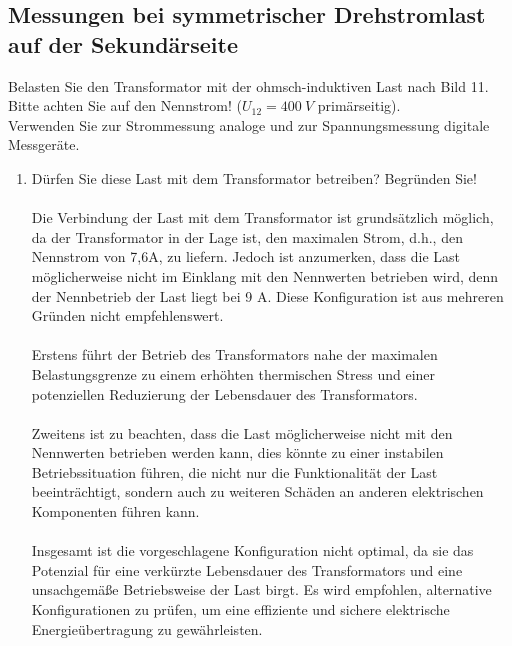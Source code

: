 \subsection{Messungen bei symmetrischer Drehstromlast auf der Sekundärseite }
Belasten Sie den Transformator mit der ohmsch-induktiven Last nach Bild 11.\\
Bitte achten Sie auf den Nennstrom! ($U_{12} = 400\ V$ primärseitig). \\
Verwenden Sie zur Strommessung analoge und zur Spannungsmessung digitale
Messgeräte.
\begin{enumerate}[label=\alph*)]
  \item Dürfen Sie diese Last mit dem Transformator betreiben? Begründen Sie!\\ \ \\
        Die Verbindung der Last mit dem Transformator ist grundsätzlich möglich, da der
        Transformator in der Lage ist, den maximalen Strom, d.h., den Nennstrom von
        7,6A, zu liefern. Jedoch ist anzumerken, dass die Last möglicherweise nicht im
        Einklang mit den Nennwerten betrieben wird, denn der Nennbetrieb der Last liegt
        bei 9 A. Diese Konfiguration ist aus mehreren Gründen nicht empfehlenswert.\\ \
        \\

        Erstens führt der Betrieb des Transformators nahe der maximalen
        Belastungsgrenze zu einem erhöhten thermischen Stress und einer potenziellen
        Reduzierung der Lebensdauer des Transformators.\\ \ \\

        Zweitens ist zu beachten, dass die Last möglicherweise nicht mit den Nennwerten
        betrieben werden kann, dies könnte zu einer instabilen Betriebssituation
        führen, die nicht nur die Funktionalität der Last beeinträchtigt, sondern auch
        zu weiteren Schäden an anderen elektrischen Komponenten führen kann.\\ \ \\

        Insgesamt ist die vorgeschlagene Konfiguration nicht optimal, da sie das
        Potenzial für eine verkürzte Lebensdauer des Transformators und eine
        unsachgemäße Betriebsweise der Last birgt. Es wird empfohlen, alternative
        Konfigurationen zu prüfen, um eine effiziente und sichere elektrische
        Energieübertragung zu gewährleisten.\\ \ \\
\end{enumerate}
